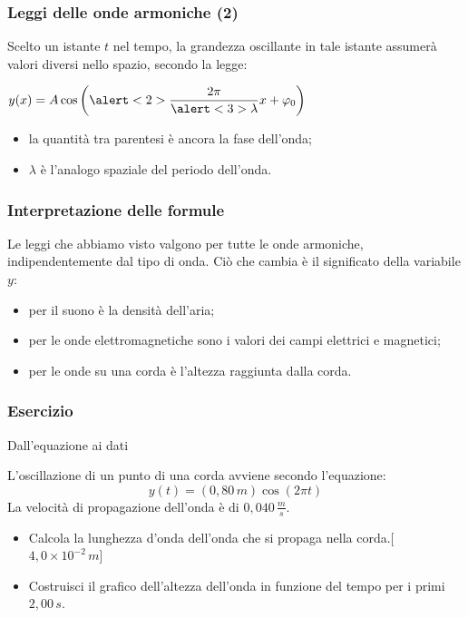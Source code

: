 \documentclass[]{beamer}
\theoremstyle{plain}
\begin{document}
\begin{frame}
  \frametitle{Leggi delle onde armoniche (2)}
  Scelto un istante $ t $ nel tempo, la grandezza oscillante in tale istante assumerà valori diversi nello spazio, secondo la legge:
  \begin{center}
  \colorbox{blue!30}{$ y(x) = A \cos \left( \alert<2>{ \dfrac{2\pi}{\alert<3>{\lambda}}x + \varphi_0 } \right) $}
  \end{center}\pause
  \begin{itemize}
    \item la quantità tra parentesi è ancora la \alert<2>{fase} dell'onda;\pause
    \item \alert<3>{$ \lambda $} è l'analogo spaziale del periodo dell'onda.
  \end{itemize}
\end{frame}


\begin{frame}
  \frametitle{Interpretazione delle formule}
Le leggi che abbiamo visto valgono per tutte le onde armoniche, indipendentemente dal tipo di onda. Ciò che cambia è il \alert{significato della variabile $ y $}:\pause
\begin{itemize}
  \item per il suono è la densità dell'aria;\pause
  \item per le onde elettromagnetiche sono i valori dei campi elettrici e magnetici;\pause
  \item per le onde su una corda è l'altezza raggiunta dalla corda.
\end{itemize}
\end{frame}


\begin{frame}
\frametitle{Esercizio}
\begin{exampleblock}{Dall'equazione ai dati}
  \small{L'oscillazione di un punto di una corda avviene secondo l'equazione:
  \[ y(t) = (0,80 \, m) \cos (2\pi t) \]
  La velocità di propagazione dell'onda è di $ 0,040 \, \frac{m}{s} $.
  \begin{itemize}
  \item Calcola la lunghezza d'onda dell'onda che si propaga nella corda.\hspace*{\fill}[$ 4,0 \times 10^{-2} \, m $]
  \item Costruisci il grafico dell'altezza dell'onda in funzione del tempo per i primi $ 2,00 \, s $.
  \end{itemize}}
\end{exampleblock}
\end{frame}
\end{document}

